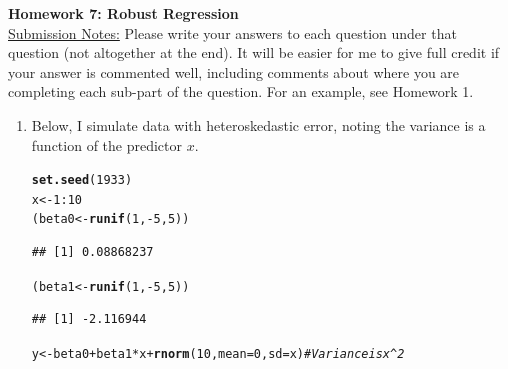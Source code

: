 \documentclass{article}\usepackage[]{graphicx}\usepackage[]{xcolor}
\makeatletter
\newcommand{\hlnum}[1]{\textcolor[rgb]{0.686,0.059,0.569}{#1}}%
\newcommand{\hlcom}[1]{\textcolor[rgb]{0.678,0.584,0.686}{\textit{#1}}}%
\newcommand{\hlopt}[1]{\textcolor[rgb]{0,0,0}{#1}}%
\newcommand{\hldef}[1]{\textcolor[rgb]{0.345,0.345,0.345}{#1}}%
\newcommand{\hlkwb}[1]{\textcolor[rgb]{0.69,0.353,0.396}{#1}}%
\newcommand{\hlkwc}[1]{\textcolor[rgb]{0.333,0.667,0.333}{#1}}%
\newcommand{\hlkwd}[1]{\textcolor[rgb]{0.737,0.353,0.396}{\textbf{#1}}}%
\newenvironment{kframe}{%
 \def\at@end@of@kframe{}%
 \ifinner\ifhmode%
  \def\at@end@of@kframe{\end{minipage}}%
  \begin{minipage}{\columnwidth}%
 \fi\fi%
 \def\FrameCommand##1{\hskip\@totalleftmargin \hskip-\fboxsep
 \colorbox{shadecolor}{##1}\hskip-\fboxsep
     \hskip-\linewidth \hskip-\@totalleftmargin \hskip\columnwidth}%
 \MakeFramed {\advance\hsize-\width
   \@totalleftmargin\z@ \linewidth\hsize
   \@setminipage}}%
 {\par\unskip\endMakeFramed%
 \at@end@of@kframe}
\newenvironment{knitrout}{}{} %
\makeatother
\begin{document}
\noindent\textbf{Homework 7: Robust Regression}\\
\noindent\makebox[\linewidth]{\rule{\textwidth}{0.4pt}}
\noindent\underline{Submission Notes:} Please write your answers to each 
question under that question (not altogether at the end). It will be easier for 
me to give full credit if your answer is commented well, including comments 
about where you are completing each sub-part of the question. For an example,
see Homework 1.\\
\noindent\makebox[\linewidth]{\rule{\textwidth}{0.4pt}}


\begin{enumerate}
  \item Below, I simulate data with heteroskedastic error, noting the variance
  is a function of the predictor $x$.
\begin{knitrout}\scriptsize
{}\color{fgcolor}\begin{kframe}
\begin{alltt}
\hlkwd{set.seed}\hldef{(}\hlnum{1933}\hldef{)}
\hldef{x} \hlkwb{<-} \hlnum{1}\hlopt{:}\hlnum{10}
\hldef{(beta0} \hlkwb{<-} \hlkwd{runif}\hldef{(}\hlnum{1}\hldef{,} \hlopt{-}\hlnum{5}\hldef{,} \hlnum{5}\hldef{))}
\end{alltt}
\begin{verbatim}
## [1] 0.08868237
\end{verbatim}
\begin{alltt}
\hldef{(beta1} \hlkwb{<-} \hlkwd{runif}\hldef{(}\hlnum{1}\hldef{,} \hlopt{-}\hlnum{5}\hldef{,} \hlnum{5}\hldef{))}
\end{alltt}
\begin{verbatim}
## [1] -2.116944
\end{verbatim}
\begin{alltt}
\hldef{y} \hlkwb{<-} \hldef{beta0} \hlopt{+} \hldef{beta1} \hlopt{*} \hldef{x} \hlopt{+} \hlkwd{rnorm}\hldef{(}\hlnum{10}\hldef{,} \hlkwc{mean} \hldef{=} \hlnum{0}\hldef{,} \hlkwc{sd} \hldef{= x)}  \hlcom{# Variance is x^2}


\end{alltt}
\end{kframe}
\end{knitrout}
\end{enumerate}
\end{document}
